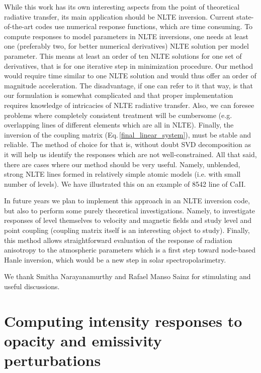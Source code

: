 \documentclass[referee]{aa}
\begin{document}
While this work has its own interesting aspects from the point of theoretical radiative transfer, its main application should be NLTE inversion. Current state-of-the-art codes use numerical response functions, which are time consuming. To compute responses to model parameters in NLTE inversions, one needs at least one (preferably two, for better numerical derivatives) NLTE solution per model parameter. This means at least an order of ten NLTE solutions for one set of derivatives, that is for one iterative step in minimization procedure. Our method would require time similar to one NLTE solution and would thus offer an order of magnitude acceleration. The disadvantage, if one can refer to it that way, is that our formulation is somewhat complicated and that proper implementation requires knowledge of intricacies of NLTE radiative transfer. Also, we can foresee problems where completely consistent treatment will be cumbersome (e.g. overlapping lines of different elements which are all in NLTE). Finally, the inversion of the coupling matrix (Eq.\,\ref{final_linear_system}), must be stable and reliable. The method of choice for that is, without doubt SVD decomposition as it will help us identify the responses which are not well-constrained. All that said, there are cases where our method should be very useful. Namely, unblended, strong NLTE lines formed in relatively simple atomic models (i.e. with small number of levels). We have illustrated this on an example of 8542 line of CaII.

In future years we plan to implement this approach in an NLTE inversion code, but also to perform some purely theoretical investigations. Namely, to investigate responses of level themselves to velocity and magnetic fields and study level and point coupling (coupling matrix itself is an interesting object to study). Finally, this method allows straightforward evaluation of the response of radiation anisotropy to the atmospheric parameters which is a first step toward node-based Hanle inversion, which would be a new step in solar spectropolarimetry. 

\begin{acknowledgements}
 We thank Smitha Narayanamurthy and Rafael Manso Sainz for stimulating and useful discussions. 
\end{acknowledgements}

\appendix
\section{Computing intensity responses to opacity and emissivity perturbations}
\label{Appendix_A}
\end{document}
